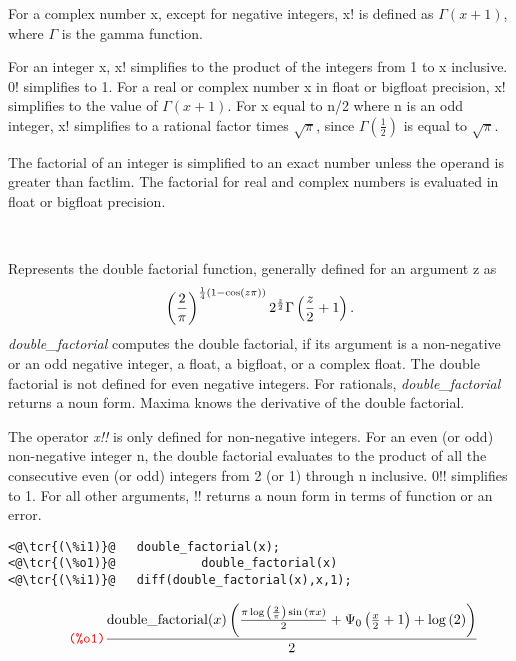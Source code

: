 \documentclass[../Maxima_Workbook.tex]{subfiles}
\begin{document}
\lz For a complex number x, except for negative integers, x! is defined as $ \Gamma (x+1) $, where $ \Gamma $ is the gamma function.

\lz For an integer x, x! simplifies to the product of the integers from 1 to x inclusive. 0! simplifies to 1. For a real or complex number x in float or bigfloat precision, x! simplifies to the value of $ \Gamma (x+1) $. For x equal to n/2 where n is an odd integer, x! simplifies to a rational factor times $ \sqrt{\pi} $, since $ \Gamma(\frac{1}{2}) $ is equal to $ \sqrt{\pi} $.

\lz The factorial of an integer is simplified to an exact number unless the operand is greater than factlim. The factorial for real and complex numbers is evaluated in float or bigfloat precision.

\lzz {} \hfill \tcr{[function]} \\
 \hfill \tcr{[operator]}

\lz Represents the double factorial function, generally defined for an argument z as
\begin{equation*}
	\left( \frac{2}{\pi} \right)^{\frac{1}{4} (1-\cos (z \pi))} 2^{\frac{z}{2}} \Gamma \left(\frac{z}{2} + 1 \right).
\end{equation*}
\emph{double\_factorial} computes the double factorial, if its argument is a non-negative or an odd negative integer, a float, a bigfloat, or a complex float. The double factorial is not defined for even negative integers. For rationals, \emph{double\_factorial} returns a noun form. Maxima knows the derivative of the double factorial.

\lz The operator \emph{x!!} is only defined for non-negative integers. For an even (or odd) non-negative integer n, the double factorial evaluates to the product of all the consecutive even (or odd) integers from 2 (or 1) through n inclusive. 0!! simplifies to 1. For all other arguments, !! returns a noun form in terms of function  or an error. 

\lz \begin{small}
\color{blue} \leqn
\begin{lstlisting}
<@\tcr{(\%i1)}@   double_factorial(x);
<@\tcr{(\%o1)}@		       double_factorial(x)
<@\tcr{(\%i1)}@   diff(double_factorial(x),x,1);
\end{lstlisting}
\vspace{-4mm} \[\tag*{\tcr{\ttfamily (\%o1)}} \frac{\operatorname{double\_ factorial}(x) \left( \frac{\ensuremath{\pi}  \log{\left( \frac{2}{\ensuremath{\pi} }\right) } \sin{\left( \ensuremath{\pi}  x\right) }}{2}+{{\Psi}_0}\left( \frac{x}{2}+1\right) +\log{(2)}\right) }{2} \]
\color{black} \reqn
\end{small}
\end{document}
